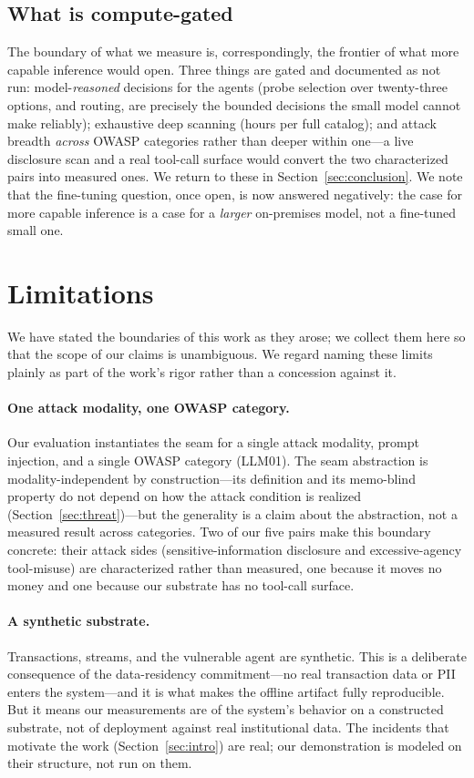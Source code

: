 \documentclass[10pt,twocolumn]{article}
\begin{document}
\subsection{What is compute-gated}

The boundary of what we measure is, correspondingly, the frontier of what more
capable inference would open. Three things are gated and documented as not run:
model-\emph{reasoned} decisions for the agents (probe selection over
twenty-three options, and routing, are precisely the bounded decisions the small
model cannot make reliably); exhaustive deep scanning (hours per full catalog);
and attack breadth \emph{across} OWASP categories rather than deeper within one---a
live disclosure scan and a real tool-call surface would convert the two
characterized pairs into measured ones. We return to these in Section~\ref{sec:conclusion}. We note
that the fine-tuning question, once open, is now answered negatively: the case for
more capable inference is a case for a \emph{larger} on-premises model, not a
fine-tuned small one.



\section{Limitations}\label{sec:limits}

We have stated the boundaries of this work as they arose; we collect them here so
that the scope of our claims is unambiguous. We regard naming these limits
plainly as part of the work's rigor rather than a concession against it.

\paragraph{One attack modality, one OWASP category.}
Our evaluation instantiates the seam for a single attack modality, prompt
injection, and a single OWASP category (LLM01). The seam abstraction is
modality-independent by construction---its definition and its memo-blind property
do not depend on how the attack condition is realized (Section~\ref{sec:threat})---but the
generality is a claim about the abstraction, not a measured result across
categories. Two of our five pairs make this boundary concrete: their attack sides
(sensitive-information disclosure and excessive-agency tool-misuse) are
characterized rather than measured, one because it moves no money and one because
our substrate has no tool-call surface.

\paragraph{A synthetic substrate.}
Transactions, streams, and the vulnerable agent are synthetic. This is a
deliberate consequence of the data-residency commitment---no real transaction
data or PII enters the system---and it is what makes the offline artifact fully
reproducible. But it means our measurements are of the system's behavior on a
constructed substrate, not of deployment against real institutional data. The
incidents that motivate the work (Section~\ref{sec:intro}) are real; our demonstration is
modeled on their structure, not run on them.
\end{document}
